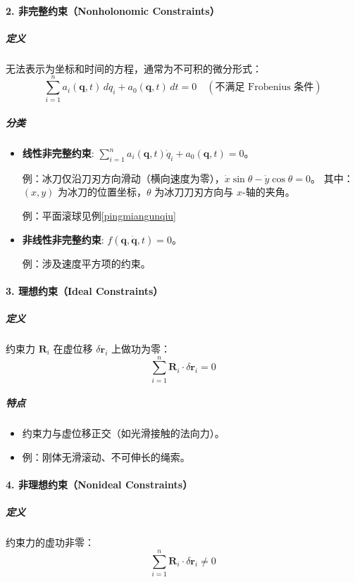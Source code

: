 \documentclass[12pt, a4paper, oneside, UTF8]{ctexbook}  %
\begin{document}
\paragraph*{2. 非完整约束（Nonholonomic Constraints）}
\subparagraph*{定义}
无法表示为坐标和时间的方程，通常为不可积的微分形式：
\begin{equation}
    \sum_{i=1}^n a_i(\mathbf{q}, t) \, dq_i + a_0(\mathbf{q}, t) \, dt = 0 \quad (\text{不满足 Frobenius 条件})
\end{equation}

\subparagraph*{分类}
\begin{itemize}
    \item \textbf{线性非完整约束}: \( \sum_{i=1}^n a_i(\mathbf{q}, t) \dot{q}_i + a_0(\mathbf{q}, t) = 0 \)。\par
    例：冰刀仅沿刀刃方向滑动（横向速度为零），\(
        \dot{x} \sin \theta - \dot{y} \cos \theta = 0
    \)。
    其中：\((x, y)\) 为冰刀的位置坐标，\(\theta\) 为冰刀刀刃方向与 \(x\)-轴的夹角。\par
    例：平面滚球见例\ref{pingmiangunqiu}
    \item \textbf{非线性非完整约束}: \( f(\mathbf{q}, \dot{\mathbf{q}}, t) = 0 \)。\par
    例：涉及速度平方项的约束。
\end{itemize}

\paragraph*{3. 理想约束（Ideal Constraints）}
\subparagraph*{定义}
约束力 \(\mathbf{R}_i\) 在虚位移 \(\delta \mathbf{r}_i\) 上做功为零：
\begin{equation}
    \sum_{i=1}^n \mathbf{R}_i \cdot \delta \mathbf{r}_i = 0
\end{equation}

\subparagraph*{特点}
\begin{itemize}
    \item 约束力与虚位移正交（如光滑接触的法向力）。
    \item 例：刚体无滑滚动、不可伸长的绳索。
\end{itemize}

\paragraph*{4. 非理想约束（Nonideal Constraints）}
\subparagraph*{定义}
约束力的虚功非零：
\begin{equation}
    \sum_{i=1}^n \mathbf{R}_i \cdot \delta \mathbf{r}_i \neq 0
\end{equation}
\end{document}
